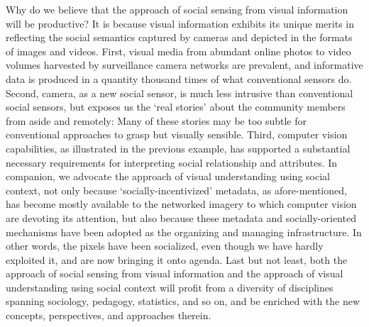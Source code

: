 Why do we believe that the approach of social sensing from visual information will be productive? It is because visual information exhibits its unique merits in reflecting the social semantics captured by cameras and depicted in the formats of images and videos. First, visual media from abundant online photos to video volumes harvested by surveillance camera networks are prevalent, and informative data is produced in a quantity thousand times of what conventional sensors do. Second, camera, as a new social sensor, is much less intrusive than conventional social sensors, but exposes us the `real stories' about the community members from aside and remotely: Many of these stories may be too subtle for conventional approaches to grasp but visually sensible. Third,  computer vision capabilities, as illustrated in the previous example, has supported a substantial necessary requirements for interpreting social relationship and attributes. In companion, we advocate the approach of visual understanding using social context, not only because `socially-incentivized' metadata, as afore-mentioned, has become mostly available to the networked imagery to which computer vision are devoting its attention, but also because these metadata and socially-oriented mechanisms have been adopted as the organizing and managing infrastructure. In other words, the pixels have been socialized, even though we have hardly exploited it, and are now bringing it onto agenda. Last but not least, both the approach of social sensing from visual information and the approach of visual understanding using social context will profit from a diversity of disciplines spanning sociology, pedagogy, statistics, and so on, and be enriched with the new concepts, perspectives, and approaches therein.

